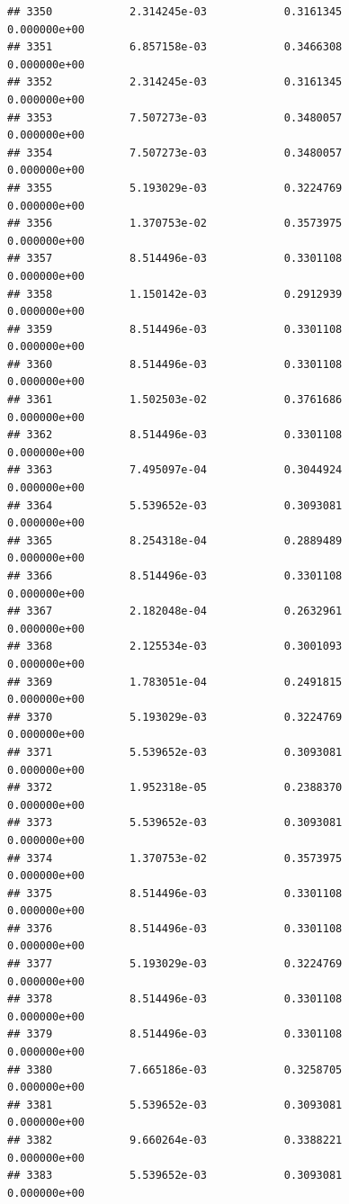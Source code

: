 \documentclass[
]{article}
\begin{document}
\begin{verbatim}
## 3350            2.314245e-03            0.3161345            0.000000e+00
## 3351            6.857158e-03            0.3466308            0.000000e+00
## 3352            2.314245e-03            0.3161345            0.000000e+00
## 3353            7.507273e-03            0.3480057            0.000000e+00
## 3354            7.507273e-03            0.3480057            0.000000e+00
## 3355            5.193029e-03            0.3224769            0.000000e+00
## 3356            1.370753e-02            0.3573975            0.000000e+00
## 3357            8.514496e-03            0.3301108            0.000000e+00
## 3358            1.150142e-03            0.2912939            0.000000e+00
## 3359            8.514496e-03            0.3301108            0.000000e+00
## 3360            8.514496e-03            0.3301108            0.000000e+00
## 3361            1.502503e-02            0.3761686            0.000000e+00
## 3362            8.514496e-03            0.3301108            0.000000e+00
## 3363            7.495097e-04            0.3044924            0.000000e+00
## 3364            5.539652e-03            0.3093081            0.000000e+00
## 3365            8.254318e-04            0.2889489            0.000000e+00
## 3366            8.514496e-03            0.3301108            0.000000e+00
## 3367            2.182048e-04            0.2632961            0.000000e+00
## 3368            2.125534e-03            0.3001093            0.000000e+00
## 3369            1.783051e-04            0.2491815            0.000000e+00
## 3370            5.193029e-03            0.3224769            0.000000e+00
## 3371            5.539652e-03            0.3093081            0.000000e+00
## 3372            1.952318e-05            0.2388370            0.000000e+00
## 3373            5.539652e-03            0.3093081            0.000000e+00
## 3374            1.370753e-02            0.3573975            0.000000e+00
## 3375            8.514496e-03            0.3301108            0.000000e+00
## 3376            8.514496e-03            0.3301108            0.000000e+00
## 3377            5.193029e-03            0.3224769            0.000000e+00
## 3378            8.514496e-03            0.3301108            0.000000e+00
## 3379            8.514496e-03            0.3301108            0.000000e+00
## 3380            7.665186e-03            0.3258705            0.000000e+00
## 3381            5.539652e-03            0.3093081            0.000000e+00
## 3382            9.660264e-03            0.3388221            0.000000e+00
## 3383            5.539652e-03            0.3093081            0.000000e+00

\end{verbatim}
\end{document}
